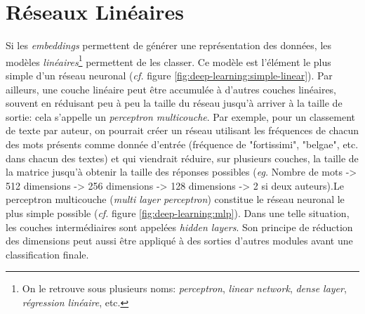 \section{Réseaux Linéaires}
\label{deep-learning:linear}

Si les \textit{embeddings} permettent de générer une représentation des données, les modèles \textit{linéaires}\footnote{On le retrouve sous plusieurs noms: \textit{perceptron}, \textit{linear network}, \textit{dense layer}, \textit{régression linéaire}, etc.} permettent de les classer. Ce modèle est l'élément le plus simple d'un réseau neuronal (\textit{cf.} figure \ref{fig:deep-learning:simple-linear}). Par ailleurs, une couche linéaire peut être accumulée à d'autres couches linéaires, souvent en réduisant peu à peu la taille du réseau jusqu'à arriver à la taille de sortie: cela s'appelle un \textit{perceptron multicouche}. Par exemple, pour un classement de texte par auteur, on pourrait créer un réseau utilisant les fréquences de chacun des mots présents comme donnée d'entrée (fréquence de "fortissimi", "belgae", etc. dans chacun des textes) et qui viendrait réduire, sur plusieurs couches, la taille de la matrice jusqu'à obtenir la taille des réponses possibles (\textit{eg.} Nombre de mots -> 512 dimensions -> 256 dimensions -> 128 dimensions -> 2 si deux auteurs).Le perceptron multicouche (\textit{multi layer perceptron}) constitue le réseau neuronal le plus simple possible (\textit{cf.} figure \ref{fig:deep-learning:mlp}). Dans une telle situation, les couches intermédiaires sont appelées \textit{hidden layers}. Son principe de réduction des dimensions peut aussi être appliqué à des sorties d'autres modules avant une classification finale.

